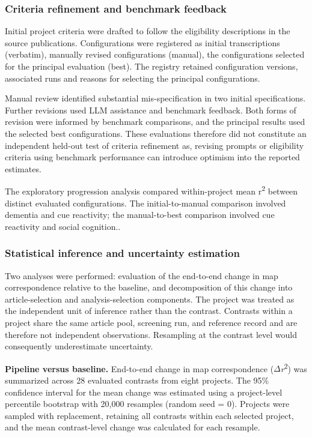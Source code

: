 \subsubsection{Criteria refinement and benchmark feedback}

Initial project criteria were drafted to follow the eligibility descriptions in the source publications. Configurations were registered as initial transcriptions (verbatim), manually revised configurations (manual), the configurations selected for the principal evaluation (best). The registry retained configuration versions, associated runs and reasons for selecting the principal configurations.

Manual review identified substantial mis-specification in two initial specifications. Further revisions used LLM assistance and benchmark feedback. Both forms of revision were informed by benchmark comparisons, and the principal results used the selected best configurations. These evaluations therefore did not constitute an independent held-out test of criteria refinement as, revising prompts or eligibility criteria using benchmark performance can introduce optimism into the reported estimates.

The exploratory progression analysis compared within-project mean r\textsuperscript{2} between distinct evaluated configurations. The initial-to-manual comparison involved dementia and cue reactivity; the manual-to-best comparison involved cue reactivity and social cognition..

\subsubsection{Statistical inference and uncertainty estimation}

Two analyses were performed: evaluation of the end-to-end change in map correspondence relative to the baseline, and decomposition of this change into article-selection and analysis-selection components. The project was treated as the independent unit of inference rather than the contrast. Contrasts within a project share the same article pool, screening run, and reference record and are therefore not independent observations. Resampling at the contrast level would consequently underestimate uncertainty.

\textbf{Pipeline versus baseline.} End-to-end change in map correspondence ($\Delta$\emph{r}\textsuperscript{2}) was summarized across 28 evaluated contrasts from eight projects. The 95\% confidence interval for the mean change was estimated using a project-level percentile bootstrap with 20,000 resamples (random seed = 0). Projects were sampled with replacement, retaining all contrasts within each selected project, and the mean contrast-level change was calculated for each resample.

